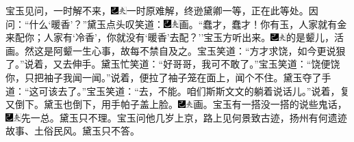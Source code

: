 宝玉见问，一时解不来，{\includegraphics[width=3mm]{../Images/00003}\includegraphics[width=3mm]{../Images/00012}\footnotesize \kaishu 一时原难解，终逊黛卿一等，正在此等处。}因问：``什么`暖香'？''黛玉点头叹笑道：{\includegraphics[width=3mm]{../Images/00003}\includegraphics[width=3mm]{../Images/00012}\footnotesize \kaishu 画。}``蠢才，蠢才！你有玉，人家就有金来配你；人家有`冷香'，你就没有`暖香'去配？''宝玉方听出来。{\includegraphics[width=3mm]{../Images/00003}\includegraphics[width=3mm]{../Images/00012}\footnotesize \kaishu 的是颦儿，活画。然这是阿颦一生心事，故每不禁自及之。}宝玉笑道：``方才求饶，如今更说狠了。''说着，又去伸手。黛玉忙笑道：``好哥哥，我可不敢了。''宝玉笑道：``饶便饶你，只把袖子我闻一闻。''说着，便拉了袖子笼在面上，闻个不住。黛玉夺了手道：``这可该去了。''宝玉笑道：``去，不能。咱们斯斯文文的躺着说话儿。''说着，复又倒下。黛玉也倒下，用手帕子盖上脸。{\includegraphics[width=3mm]{../Images/00003}\includegraphics[width=3mm]{../Images/00012}\footnotesize \kaishu 画。}宝玉有一搭没一搭的说些鬼话，{\includegraphics[width=3mm]{../Images/00003}\includegraphics[width=3mm]{../Images/00012}\footnotesize \kaishu 先一总。}黛玉只不理。宝玉问他几岁上京，路上见何景致古迹，扬州有何遗迹故事、土俗民风。黛玉只不答。

